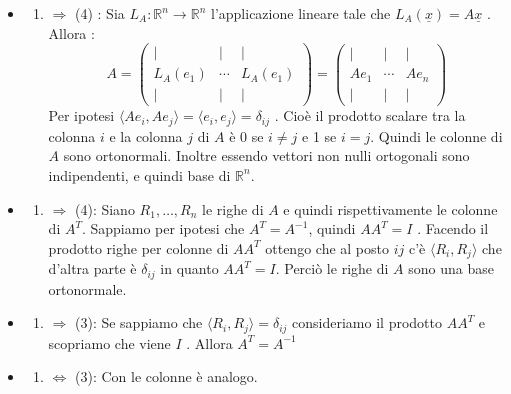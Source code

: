 \documentclass[
  a4paper,
]{article}
\providecommand{\tightlist}{%
  \setlength{\itemsep}{0pt}\setlength{\parskip}{0pt}}
\providecommand{\tightlist}{}
\begin{document}
\begin{proofbox}
\begin{itemize}
\item
  \begin{enumerate}
  \def\labelenumi{(\arabic{enumi})}
  \tightlist
  \item
    \(\Rightarrow\) (4) : Sia \(L_A : \mathbb{R}^n \to \mathbb{R}^n\)
    l'applicazione lineare tale che
    \(L_A (\underline{x}) = A\underline{x}\) . Allora : \[
    A = \left(  
    \begin{array}{cccc}  
    \big| & \big| &  \big| \\  
    L_A(e_1) 
    &  
    \cdots  
    &  
    L_A(e_1) \\  
    \big| & \big| & \big|  
    \end{array}  
    \right)
    = \left(  
    \begin{array}{cccc}  
    \big| & \big| &  \big| \\  
    Ae_1
    &  
    \cdots  
    &  
    Ae_n \\  
    \big| & \big| & \big|  
    \end{array}  
    \right)
    \] Per ipotesi
    \(\langle Ae_i, Ae_j \rangle = \langle e_i, e_j \rangle = \delta_{ij}\)
    . Cioè il prodotto scalare tra la colonna \(i\) e la colonna \(j\)
    di \(A\) è \(0\) se \(i \neq j\) e 1 se \(i = j\). Quindi le colonne
    di \(A\) sono ortonormali. Inoltre essendo vettori non nulli
    ortogonali sono indipendenti, e quindi base di \(\mathbb{R}^n\).
  \end{enumerate}
\item
  \begin{enumerate}
  \def\labelenumi{(\arabic{enumi})}
  \setcounter{enumi}{2}
  \tightlist
  \item
    \(\Rightarrow\) (4): Siano \(R_1, \dots, R_n\) le righe di \(A\) e
    quindi rispettivamente le colonne di \(A^T\). Sappiamo per ipotesi
    che \(A^T = A^{-1}\), quindi \(AA^T = I\) . Facendo il prodotto
    righe per colonne di \(AA^T\) ottengo che al posto \(ij\) c'è
    \(\langle R_i, R_j \rangle\) che d'altra parte è \(\delta_{ij}\) in
    quanto \(AA^T = I\). Perciò le righe di \(A\) sono una base
    ortonormale.
  \end{enumerate}
\item
  \begin{enumerate}
  \def\labelenumi{(\arabic{enumi})}
  \setcounter{enumi}{3}
  \tightlist
  \item
    \(\Rightarrow\) (3): Se sappiamo che
    \(\langle R_i, R_j \rangle = \delta_{ij}\) consideriamo il prodotto
    \(AA^T\) e scopriamo che viene \(I\) . Allora \(A^T = A^{-1}\)
  \end{enumerate}
\item
  \begin{enumerate}
  \def\labelenumi{(\arabic{enumi})}
  \setcounter{enumi}{3}
  \tightlist
  \item
    \(\iff\) (3): Con le colonne è analogo.
  \end{enumerate}
\end{itemize}
\end{proofbox}
\end{document}
